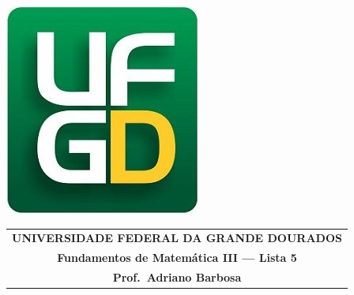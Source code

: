 \documentclass[a4paper,5pt]{amsbook}
\begin{document}
\thispagestyle{empty}
\pagestyle{empty}
\begin{minipage}[h]{0.14\textwidth}
	\includegraphics[scale=0.24]{../ufgd.png}
\end{minipage}
\begin{minipage}[h]{\textwidth}
\begin{tabular}{c}
{{\bf UNIVERSIDADE FEDERAL DA GRANDE DOURADOS}}\\
{{\bf Fundamentos de Matem\'{a}tica III --- Lista 5}}\\
{{\bf Prof.\ Adriano Barbosa}}\\
\end{tabular}
\vspace{-0.45cm}
%
\end{minipage}

\end{document}
